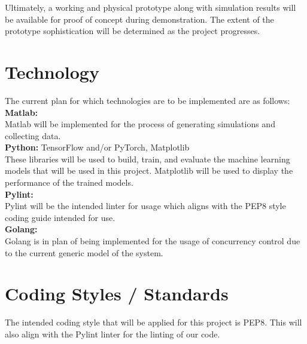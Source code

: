 \documentclass[12pt,a4]{report}
\begin{document}
Ultimately, a working and physical prototype along with simulation results will be available for proof of concept during demonstration. The extent of the prototype sophistication will be determined as the project progresses.

\section*{Technology}
The current plan for which technologies are to be implemented are as follows:\\

\noindent \textbf{Matlab:}\\
\noindent Matlab will be implemented for the process of generating simulations and collecting data.\\

\noindent \textbf{Python:} TensorFlow and/or PyTorch, Matplotlib\\
\noindent These libraries will be used to build, train, and evaluate the machine learning models that will be used in this project. Matplotlib will be used to display the performance of the trained models.\\

\noindent \textbf{Pylint:}\\
\noindent Pylint will be the intended linter for usage which aligns with the PEP8 style coding guide intended for use.\\

\noindent \textbf{Golang:}\\
\noindent Golang is in plan of being implemented for the usage of concurrency control due to the current generic model of the system. 

\section*{Coding Styles / Standards}
The intended coding style that will be applied for this project is PEP8. This will also align with the Pylint linter for the linting of our code. 
\end{document}
